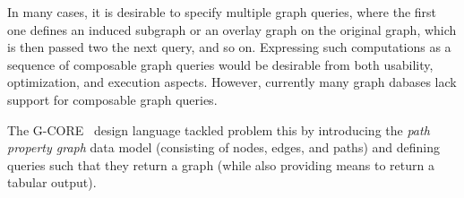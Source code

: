 
In many cases, it is desirable to specify multiple graph queries, where the
first one defines an induced subgraph or an overlay graph on the original graph,
which is then passed two the next query, and so on. Expressing such computations
as a sequence of composable graph queries would be desirable from both
usability, optimization, and execution aspects. However, currently many graph
dabases lack support for composable graph queries.

The \mbox{G-CORE}~\cite{DBLP:conf/sigmod/AnglesABBFGLPPS18} design language
tackled problem this by introducing the \emph{path property graph} data model
(consisting of nodes, edges, and paths) and defining queries such that they
return a graph (while also providing means to return a tabular output).


